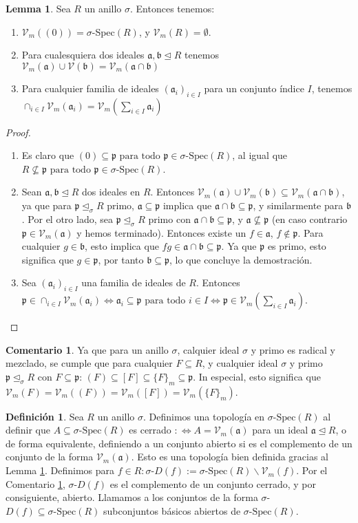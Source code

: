 \documentclass[12pt,a4paper,BCOR15mm,twoside,DIV12]{article}
\def\sSpec{\sigma\text{-Spec}}
\def\Vm{\mathcal{V}_m}
\def\V{\mathcal{V}}
\def\fa{\text{ para todo }}
\def\a{\mathfrak{a}}
\def\b{\mathfrak{b}}
\def\p{\mathfrak{p}}
\def\s{\sigma}
\def\si{\unlhd_{\sigma}}
\newenvironment{bew}{\begin{proof}[Proof]}{\end{proof}}
\theoremstyle{definition}
\newtheorem{rem}[Satz]{Comentario}
\newtheorem{defn}[Satz]{Definición}
\newtheorem{lem}[Satz]{Lemma}
\begin{document}
\begin{lem}\label{topologywelldef}
Sea $R$ un anillo $\s$. Entonces tenemos:
\begin{enumerate}
\item $\Vm((0)) = \s$-Spec$(R)$, y $\Vm(R) = \emptyset$.
\item Para cualesquiera dos ideales $\a,\b \unlhd R$ tenemos $\Vm(\a) \cup \V(\b) = \Vm(\a \cap \b)$
\item Para cualquier familia de ideales $(\a_i)_{i \in I}$ para un conjunto índice $I$, tenemos $\cap_{i \in I} \Vm(\a_i) = \Vm(\sum_{i \in I} \a_i)$
\end{enumerate}
\begin{bew}
\begin{enumerate}
\item Es claro que $(0) \subseteq \p \fa \p \in \sSpec(R)$, al igual que $R \not\subseteq \p \fa \p \in \sSpec(R)$.
\item Sean $\a, \b \unlhd R$ dos ideales en $R$. Entonces $\Vm(\a) \cup \Vm(\b) \subseteq \Vm(\a \cap \b)$, ya que para $\p \si R$ primo, $\a \subseteq \p$ implica que $\a \cap \b \subseteq \p$, y similarmente para $\b$.
Por el otro lado, sea $\p \si R$ primo con $\a \cap \b \subseteq \p$, y $\a \not\subseteq \p$ (en caso contrario $\p \in \Vm(\a)$ y hemos terminado). Entonces existe un $f \in \a$, $f \notin \p$. 
Para cualquier $g \in \b$, esto implica que $fg \in \a \cap \b \subseteq \p$. Ya que $\p$ es primo, esto significa que $g \in \p$, por tanto $\b \subseteq \p$, lo que concluye la demostración.
\item Sea $(\a_i)_{i \in I}$ una familia de ideales de $R$. Entonces $\p \in \cap_{i \in I} \Vm(\a_i) \Leftrightarrow \a_i \subseteq \p \fa i \in I \Leftrightarrow \p \in \Vm(\sum_{i \in I} \a_i)$.
\end{enumerate}
\end{bew}
\end{lem}

\begin{rem}\label{vmsequal}
Ya que para un anillo $\s$, calquier ideal $\s$ y primo es radical y mezclado, se cumple que para cualquier $F \subseteq R$, y cualquier ideal $\s$ y primo $\p \si R$ con $F \subseteq \p$:
$(F) \subseteq [F] \subseteq \{ F \}_m \subseteq \p$. In especial, esto significa que $\Vm(F) = \Vm((F)) = \Vm([F]) = \Vm(\{F\}_m)$.
\end{rem}

\begin{defn}
Sea $R$ un anillo $\s$. Definimos una topología en $\sSpec(R)$ al definir que $A \subseteq \sSpec(R)$ es cerrado $:\Leftrightarrow A = \Vm(\a)$ para un ideal $\a \unlhd R$, o de forma equivalente,
 definiendo a un conjunto abierto si es el complemento de un conjunto de la forma $\Vm(\a)$. Esto es una topología bien definida gracias al Lemma \ref{topologywelldef}.
Definimos para $f \in R: \s$-$ D(f):= \sSpec(R) \backslash \Vm(f)$. Por el Comentario \ref{vmsequal}, $\s$-$D(f)$ es el complemento de un conjunto cerrado, y por consiguiente, abierto.
Llamamos a los conjuntos de la forma $\s$-$D(f) \subseteq \sSpec(R)$ subconjuntos básicos abiertos de $\sSpec(R)$.
\end{defn}
\end{document}
